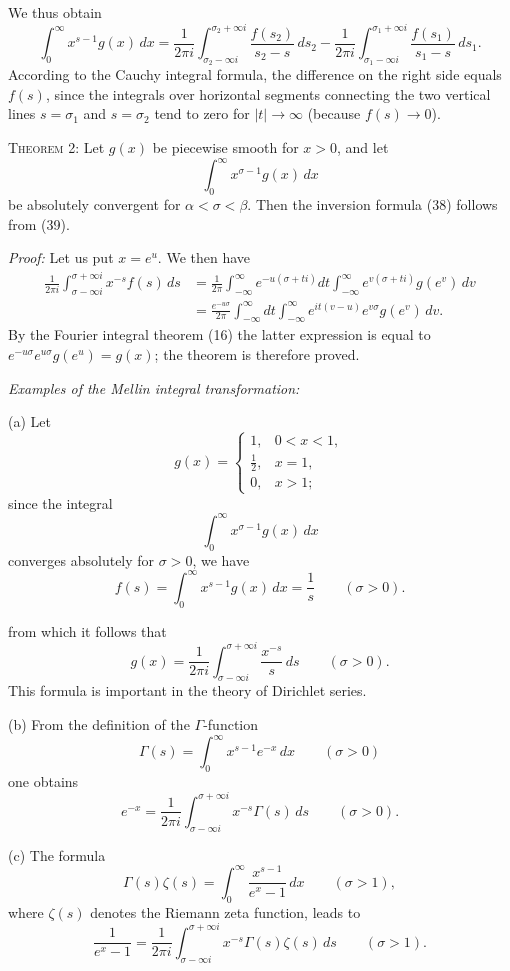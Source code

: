 We thus obtain
\[
\int_0^\infty x^{s-1}g(x)\,dx
=\frac{1}{2\pi i}\int_{\sigma_2-\infty i}^{\sigma_2+\infty i}\frac{f(s_2)}{s_2-s}\,ds_2
-\frac{1}{2\pi i}\int_{\sigma_1-\infty i}^{\sigma_1+\infty i}\frac{f(s_1)}{s_1-s}\,ds_1.
\]
According to the Cauchy integral formula, the difference on the right side equals $f(s)$, since the integrals over horizontal segments connecting the two vertical lines $s=\sigma_1$ and $s=\sigma_2$ tend to zero for $|t|\to\infty$ (because $f(s)\to0$).

\textsc{Theorem 2:} Let $g(x)$ be piecewise smooth for $x>0$, and let
\[
\int_0^\infty x^{\sigma-1}g(x)\,dx
\]
be absolutely convergent for $\alpha<\sigma<\beta$. Then the inversion formula (38) follows from (39).

\emph{Proof:} Let us put $x=e^u$. We then have
\[
\begin{aligned}
\frac{1}{2\pi i}\int_{\sigma-\infty i}^{\sigma+\infty i}x^{-s}f(s)\,ds
&=\frac{1}{2\pi}\int_{-\infty}^{\infty}e^{-u(\sigma+ti)}dt
\int_{-\infty}^{\infty}e^{v(\sigma+ti)}g(e^v)\,dv\\
&=\frac{e^{-u\sigma}}{2\pi}\int_{-\infty}^{\infty}dt
\int_{-\infty}^{\infty}e^{it(v-u)}e^{v\sigma}g(e^v)\,dv.
\end{aligned}
\]
By the Fourier integral theorem (16) the latter expression is equal to $e^{-u\sigma}e^{u\sigma}g(e^u)=g(x)$; the theorem is therefore proved.

\emph{Examples of the Mellin integral transformation:}

(a) Let
\[
g(x)=
\begin{cases}
1,&0<x<1,\\
\tfrac12,&x=1,\\
0,&x>1;
\end{cases}
\]
since the integral
\[
\int_0^\infty x^{\sigma-1}g(x)\,dx
\]
converges absolutely for $\sigma>0$, we have
\[
f(s)=\int_0^\infty x^{s-1}g(x)\,dx=\frac{1}{s}\qquad(\sigma>0).
\]

from which it follows that
\[
g(x)=\frac{1}{2\pi i}\int_{\sigma-\infty i}^{\sigma+\infty i}\frac{x^{-s}}{s}\,ds
\qquad(\sigma>0).
\]
This formula is important in the theory of Dirichlet series.

(b) From the definition of the $\Gamma$-function
\[
\Gamma(s)=\int_0^\infty x^{s-1}e^{-x}\,dx
\qquad(\sigma>0)
\]
one obtains
\[
e^{-x}=\frac{1}{2\pi i}\int_{\sigma-\infty i}^{\sigma+\infty i}x^{-s}\Gamma(s)\,ds
\qquad(\sigma>0).
\]

(c) The formula
\[
\Gamma(s)\zeta(s)=\int_0^\infty\frac{x^{s-1}}{e^x-1}\,dx
\qquad(\sigma>1),
\]
where $\zeta(s)$ denotes the Riemann zeta function, leads to
\[
\frac{1}{e^x-1}=\frac{1}{2\pi i}\int_{\sigma-\infty i}^{\sigma+\infty i}x^{-s}\Gamma(s)\zeta(s)\,ds
\qquad(\sigma>1).
\]

